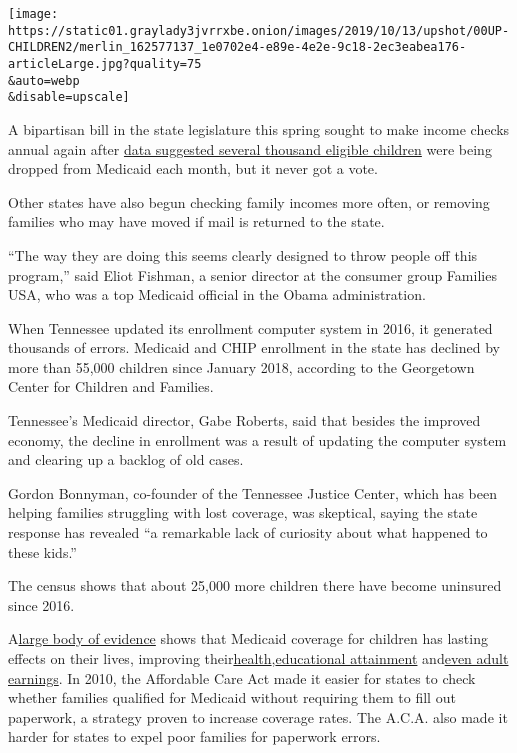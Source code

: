 \texttt{[image: https://static01.graylady3jvrrxbe.onion/images/2019/10/13/upshot/00UP-CHILDREN2/merlin\_162577137\_1e0702e4-e89e-4e2e-9c18-2ec3eabea176-articleLarge.jpg?quality=75\\\&auto=webp\\\&disable=upscale]}

A bipartisan bill in the state legislature this spring sought to make
income checks annual again after
\href{https://www.texastribune.org/2019/04/22/texas-takes-thousands-kids-medicaid-every-month-due-red-tape/}{data
suggested several thousand eligible children} were being dropped from
Medicaid each month, but it never got a vote.

Other states have also begun checking family incomes more often, or
removing families who may have moved if mail is returned to the state.

``The way they are doing this seems clearly designed to throw people off
this program,'' said Eliot Fishman, a senior director at the consumer
group Families USA, who was a top Medicaid official in the Obama
administration.

When Tennessee updated its enrollment computer system in 2016, it
generated thousands of errors. Medicaid and CHIP enrollment in the state
has declined by more than 55,000 children since January 2018, according
to the Georgetown Center for Children and Families.

Tennessee's Medicaid director, Gabe Roberts, said that besides the
improved economy, the decline in enrollment was a result of updating the
computer system and clearing up a backlog of old cases.

Gordon Bonnyman, co-founder of the Tennessee Justice Center, which has
been helping families struggling with lost coverage, was skeptical,
saying the state response has revealed ``a remarkable lack of curiosity
about what happened to these kids.''

The census shows that about 25,000 more children there have become
uninsured since 2016.

A\href{https://www.nytimes3xbfgragh.onion/2016/09/27/upshot/its-easy-for-obamacare-critics-to-overlook-the-merits-of-medicaid-expansion.html}{large
body of evidence} shows that Medicaid coverage for children has lasting
effects on their lives, improving
their\href{http://www-personal.umich.edu/~mille/MillerWherry_Prenatal2014.pdf}{health},\href{https://www.nber.org/papers/w20178.pdf}{educational
attainment}
and\href{https://www.nytimes3xbfgragh.onion/2015/01/13/upshot/how-medicaid-for-children-recoups-much-of-its-cost-in-the-long-run.html}{even
adult earnings}. In 2010, the Affordable Care Act made it easier for
states to check whether families qualified for Medicaid without
requiring them to fill out paperwork, a strategy proven to increase
coverage rates. The A.C.A. also made it harder for states to expel poor
families for paperwork errors.

